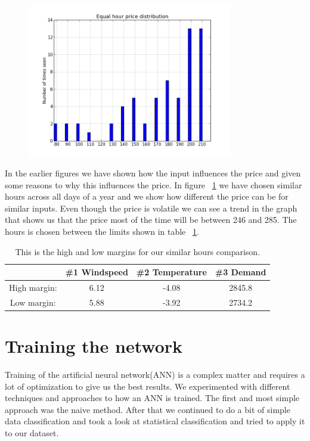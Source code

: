 \begin{figure}[H]
\centering
\includegraphics[width=0.8\textwidth ,natwidth=410,natheight=237]{billeder/energy_price_plots/same_hour_distribution.png}
\caption{}
\label{fig:same_hour_distribution}
\end{figure}

In the earlier figures we have shown how the input influences the price and given some reasons to why this influences the price. In figure ~\ref{fig:same_hour_distribution} we have chosen similar hours across all days of a year and we show how different the price can be for similar inputs. Even though the price is volatile we can see a trend in the graph that shows us that the price most of the time will be between 246 and 285. The hours is chosen between the limits shown in table ~\ref{table:similarHoursLimits}.

\begin{table}[H]
\centering  %
\begin{tabular}{c c c c} %
 & \#1 Windspeed & \#2 Temperature & \#3 Demand \\ [0.5ex] %
\hline                  %
High margin: & 6.12 & -4.08 & 2845.8  \\
Low margin: & 5.88 & -3.92 & 2734.2 \\ [1ex] %
\hline %
\end{tabular}
\caption{This is the high and low margins for our similar hours comparison.} %
\label{table:similarHoursLimits} %
\end{table}

\section{Training the network}
Training of the artificial neural network(ANN) is a complex matter and requires a lot of optimization to give us the best results. We experimented with different techniques and approaches to how an ANN is trained. The first and most simple approach was the naive method. After that we continued to do a bit of simple data classification and took a look at statistical classification and tried to apply it to our dataset.

